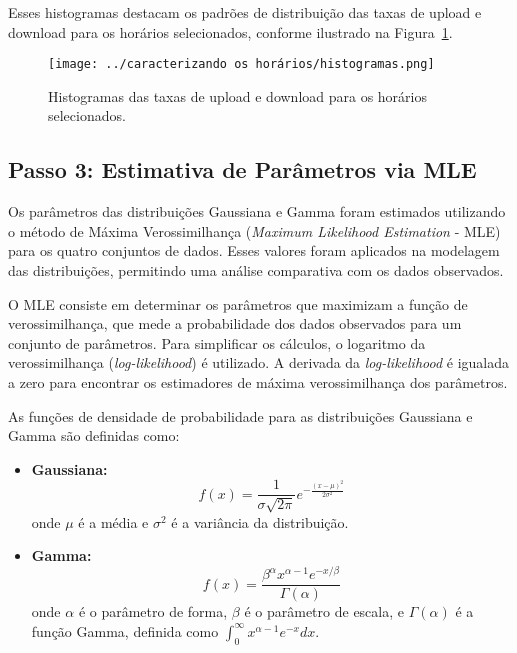 Esses histogramas destacam os padrões de distribuição das taxas de upload e download para os horários selecionados, conforme ilustrado na Figura~\ref{fig:histogramas_horarios}.

\begin{figure}[H]
    \centering
    \texttt{[image: ../caracterizando os horários/histogramas.png]}
    \caption{Histogramas das taxas de upload e download para os horários selecionados.}
    \label{fig:histogramas_horarios}
\end{figure}

\subsection{Passo 3: Estimativa de Parâmetros via MLE}

Os parâmetros das distribuições Gaussiana e Gamma foram estimados utilizando o método de Máxima Verossimilhança (\textit{Maximum Likelihood Estimation} - MLE) para os quatro conjuntos de dados. Esses valores foram aplicados na modelagem das distribuições, permitindo uma análise comparativa com os dados observados.

O MLE consiste em determinar os parâmetros que maximizam a função de verossimilhança, que mede a probabilidade dos dados observados para um conjunto de parâmetros. Para simplificar os cálculos, o logaritmo da verossimilhança (\textit{log-likelihood}) é utilizado. A derivada da \textit{log-likelihood} é igualada a zero para encontrar os estimadores de máxima verossimilhança dos parâmetros.

As funções de densidade de probabilidade para as distribuições Gaussiana e Gamma são definidas como:

\begin{itemize}
    \item \textbf{Gaussiana:}
    \begin{equation}
        f(x) = \frac{1}{\sigma \sqrt{2\pi}} e^{-\frac{(x - \mu)^2}{2\sigma^2}}
    \end{equation}
    onde \(\mu\) é a média e \(\sigma^2\) é a variância da distribuição.
    
    \item \textbf{Gamma:}
    \begin{equation}
        f(x) = \frac{\beta^\alpha x^{\alpha - 1} e^{-x/\beta}}{\Gamma(\alpha)}
    \end{equation}
    onde \(\alpha\) é o parâmetro de forma, \(\beta\) é o parâmetro de escala, e \(\Gamma(\alpha)\) é a função Gamma, definida como \(\int_0^\infty x^{\alpha - 1} e^{-x} dx\).
\end{itemize}

